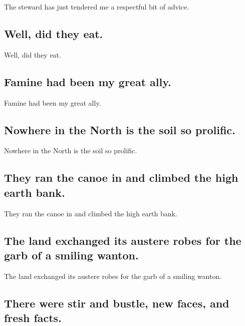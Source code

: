 \documentclass[]{article}
\begin{document}
The steward has just tendered me a respectful bit of advice.

\hypertarget{well-did-they-eat.}{%
\subsection{Well, did they eat.}\label{well-did-they-eat.}}

Well, did they eat.

\hypertarget{famine-had-been-my-great-ally.}{%
\subsection{Famine had been my great
ally.}\label{famine-had-been-my-great-ally.}}

Famine had been my great ally.

\hypertarget{nowhere-in-the-north-is-the-soil-so-prolific.}{%
\subsection{Nowhere in the North is the soil so
prolific.}\label{nowhere-in-the-north-is-the-soil-so-prolific.}}

Nowhere in the North is the soil so prolific.

\hypertarget{they-ran-the-canoe-in-and-climbed-the-high-earth-bank.}{%
\subsection{They ran the canoe in and climbed the high earth
bank.}\label{they-ran-the-canoe-in-and-climbed-the-high-earth-bank.}}

They ran the canoe in and climbed the high earth bank.

\hypertarget{the-land-exchanged-its-austere-robes-for-the-garb-of-a-smiling-wanton.}{%
\subsection{The land exchanged its austere robes for the garb of a
smiling
wanton.}\label{the-land-exchanged-its-austere-robes-for-the-garb-of-a-smiling-wanton.}}

The land exchanged its austere robes for the garb of a smiling wanton.

\hypertarget{there-were-stir-and-bustle-new-faces-and-fresh-facts.}{%
\subsection{There were stir and bustle, new faces, and fresh
facts.}\label{there-were-stir-and-bustle-new-faces-and-fresh-facts.}}
\end{document}
